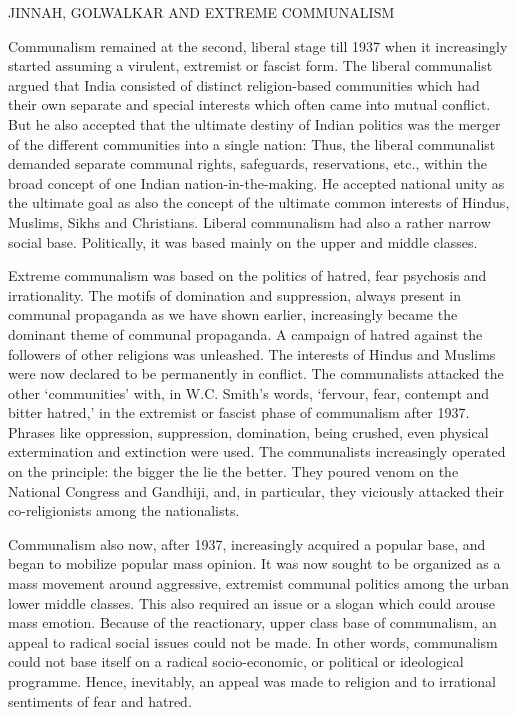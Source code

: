 JINNAH, GOLWALKAR AND EXTREME COMMUNALISM 

Communalism remained at the second, liberal stage till 1937 when it increasingly started assuming a virulent, extremist or fascist form. The liberal communalist argued that India consisted of distinct religion-based communities which had their own separate and special interests which often came into mutual conflict. But he also accepted that the ultimate destiny of Indian politics was the merger of the different communities into a single nation: Thus, the liberal communalist demanded separate communal rights, safeguards, reservations, etc., within the broad concept of one Indian nation-in-the-making. He accepted national unity as the ultimate goal as also the concept of the ultimate common interests of Hindus, Muslims, Sikhs and Christians. Liberal communalism had also a rather narrow social base. Politically, it was based mainly on the upper and middle classes. 

Extreme communalism was based on the politics of hatred, fear psychosis and irrationality. The motifs of domination and suppression, always present in communal propaganda as we have shown earlier, increasingly became the dominant theme of communal propaganda. A campaign of hatred against the followers of other religions was unleashed. The interests of Hindus and Muslims were now declared to be permanently in conflict. The communalists attacked the other `communities' with, in W.C. Smith's words, `fervour, fear, contempt and bitter hatred,' in the extremist or fascist phase of communalism after 1937. Phrases like oppression, suppression, domination, being crushed, even physical extermination and extinction were used. The communalists increasingly operated on the principle: the bigger the lie the better. They poured venom on the National Congress and Gandhiji, and, in particular, they viciously attacked their co-religionists among the nationalists. 

Communalism also now, after 1937, increasingly acquired a popular base, and began to mobilize popular mass opinion. It was now sought to be organized as a mass movement around aggressive, extremist communal politics among the urban lower middle classes. This also required an issue or a slogan which could arouse mass emotion. Because of the reactionary, upper class base of communalism, an appeal to radical social issues could not be made. In other words, communalism could not base itself on a radical socio-economic, or political or ideological programme. Hence, inevitably, an appeal was made to religion and to irrational sentiments of fear and hatred. 


